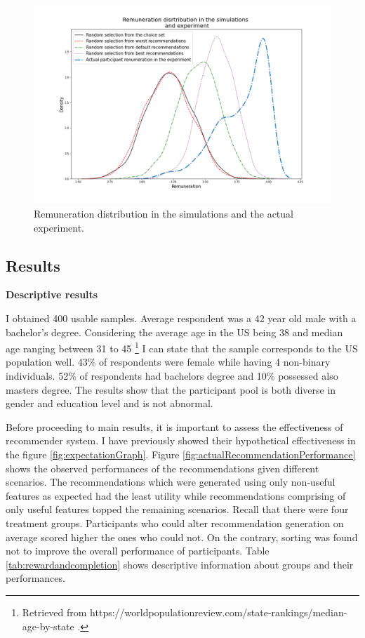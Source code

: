 \documentclass[a4paper,12pt]{article}
\begin{document}
\begin{figure}
    \centering
    \includegraphics[width=0.99\linewidth]{staticFiles/AverageRemunerationWorstToBest.png}
    \caption[Remuneration distribution]{Remuneration distribution in the simulations and the actual experiment.}
    \label{fig:averageRemuneration}
\end{figure}




\subsection{Results}

\textbf{Descriptive results}

I obtained 400 usable samples. Average respondent was a 42 year old male with a bachelor's degree. Considering the average age in the US being 38 and median age ranging between 31 to 45 \footnote{Retrieved from https://worldpopulationreview.com/state-rankings/median-age-by-state .} I can state that the sample corresponds to the US population well. 43\% of respondents were female while having 4 non-binary individuals. 52\% of respondents had bachelors degree and 10\% possessed also masters degree. The results show that the participant pool is both diverse in gender and education level and is not abnormal.

Before proceeding to main results, it is important to assess the effectiveness of recommender system. I have previously showed their hypothetical effectiveness in the figure \ref{fig:expectationGraph}. Figure \ref{fig:actualRecommendationPerformance} shows the observed performances of the recommendations given different scenarios. The recommendations which were generated using only non-useful features as expected had the least utility while recommendations comprising of only useful features topped the remaining scenarios. Recall that there were four treatment groups. Participants who could alter recommendation generation on average scored higher the ones who could not. On the contrary, sorting was found not to improve the overall performance of participants. Table \ref{tab:rewardandcompletion} shows  descriptive  information about groups and their performances.
\end{document}
